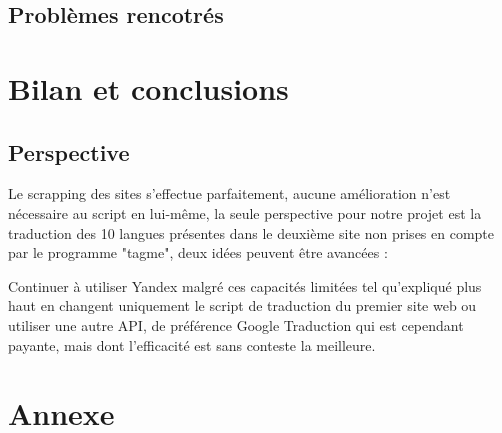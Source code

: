\documentclass[oneside,13pt,a4paper]{report}
\begin{document}
\section{Problèmes rencotrés}

\chapter{Bilan et conclusions}



\section{Perspective}
Le scrapping des sites s'effectue parfaitement, aucune amélioration n'est nécessaire au script en lui-même, la seule perspective pour notre projet est la traduction des 10 langues présentes dans le deuxième site non prises en compte par le programme "tagme", deux idées peuvent être avancées :

Continuer à utiliser Yandex malgré ces capacités limitées tel qu'expliqué plus haut en changent uniquement le script de traduction du premier site web ou utiliser une autre API, de préférence Google Traduction qui est cependant payante, mais dont l'efficacité est sans conteste la meilleure.


\appendix
\chapter{Annexe}
\end{document}
